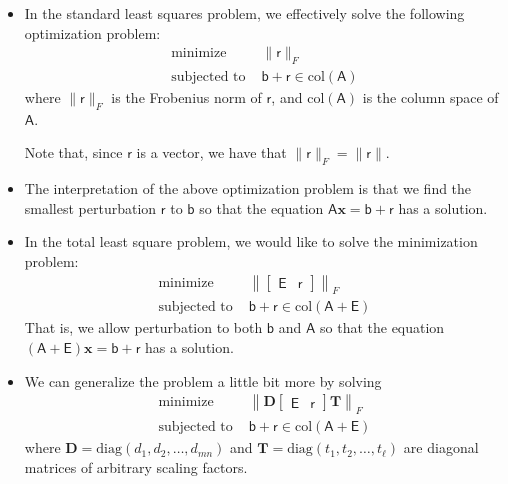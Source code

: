 \documentclass[10pt]{article}
\newcommand{\ve}[1]{\mathbf{#1}}
\newcommand{\msf}[1]{\mathsf{#1}}
\newcommand{\mrm}[1]{\mathrm{#1}}
\begin{document}
  \begin{itemize}
    \item In the standard least squares problem, we effectively
      solve the following optimization problem:
      \begin{align*}
        \mbox{minimize } & \| \msf{r} \|_F\\
        \mbox{subjected to } & \msf{b} + \msf{r} \in \mrm{col}(\msf{A})
      \end{align*}
      where $\| \msf{r} \|_F$ is the Frobenius norm of $\msf{r}$,
      and $\mrm{col}(\msf{A})$ is the column space of $\msf{A}$.
      
      Note that, since $\msf{r}$ is a vector, we have that
      $\| \msf{r} \|_F = \| \msf{r} \|$.
      
    \item The interpretation of the above optimization problem is
      that we find the smallest perturbation $\msf{r}$ to $\msf{b}$ so 
      that the equation $\msf{A} \ve{x} = \msf{b} + \msf{r}$
      has a solution.
      
    \item In the total least square problem, we would like to
      solve the minimization problem:
      \begin{align*}
        \mbox{minimize } & \left\| \left[ \begin{array}{c|c} \msf{E} & \msf{r} \end{array}\right] \right\|_F \\
        \mbox{subjected to } &\msf{b} + \msf{r} \in \mrm{col}(\msf{A} + \msf{E})
      \end{align*}
      That is, we allow perturbation to both $\msf{b}$ and $\msf{A}$
      so that the equation $(\msf{A} + \msf{E})\ve{x} = \msf{b} + \msf{r}$
      has a solution.
      
    \item We can generalize the problem a little bit more by solving
      \begin{align*}
        \mbox{minimize } & \left\| \ve{D} \left[ \begin{array}{c|c} \msf{E} & \msf{r} \end{array}\right] \ve{T} \right\|_F \\
        \mbox{subjected to } &\msf{b} + \msf{r} \in \mrm{col}(\msf{A} + \msf{E})
      \end{align*}
      where $\ve{D} = \mrm{diag}(d_1, d_2, \dotsc, d_{mn})$
      and $\ve{T} = \mrm{diag}(t_1, t_2, \dotsc, t_{\ell})$
      are diagonal matrices of arbitrary scaling factors.                  
      

\end{itemize}
\end{document}

